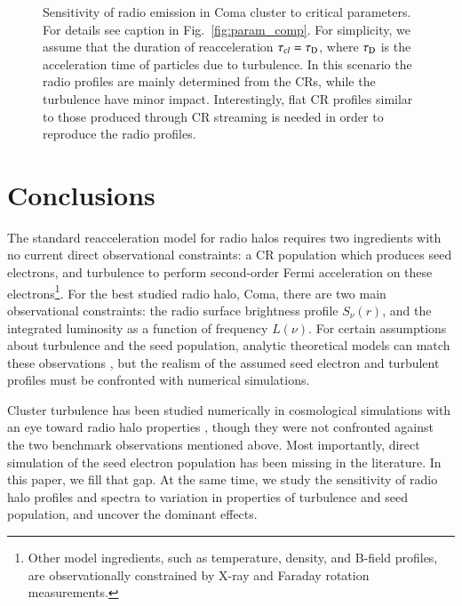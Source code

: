 \documentclass[fleqn,usenatbib,useAMS]{mnras}
\begin{document}
\begin{figure}
\begin{minipage}{1\columnwidth}
\begin{center}
   \end{center}
\end{minipage}
\caption{Sensitivity of radio emission in Coma cluster to critical
  parameters. For details see caption in
  Fig.~\ref{fig:param_comp}. For simplicity, we assume that the
  duration of reacceleration $\tau_{cl}=\tau_{\rm D}$, where $\tau_{\rm
    D}$ is the acceleration time of particles due to turbulence. In
  this scenario the radio profiles are mainly determined from the CRs,
  while the turbulence have minor impact. Interestingly, flat CR
  profiles similar to those produced through CR streaming is needed in
  order to reproduce the radio profiles.}
  \label{fig:param_comp_tcl_tD}
\end{figure}

\section{Conclusions}
\label{sec:conclusions}

The standard reacceleration model for radio halos requires two ingredients with
no current direct observational constraints: a CR population which produces seed
electrons, and turbulence to perform second-order Fermi acceleration on these
electrons\footnote{Other model ingredients, such as temperature, density, and
  B-field profiles, are observationally constrained by X-ray and Faraday
  rotation measurements.}. For the best studied radio halo, Coma, there are two
main observational constraints: the radio surface brightness profile
$S_{\nu}(r)$, and the integrated luminosity as a function of frequency
$L(\nu)$. For certain assumptions about turbulence and the seed population,
analytic theoretical models can match these observations \citep{brunetti11}, but
the realism of the assumed seed electron and turbulent profiles must be
confronted with numerical simulations.

Cluster turbulence has been studied numerically in cosmological simulations with
an eye toward radio halo properties \citep{2013ApJ...771..131B,
  miniati15}, though they were not confronted against the two
benchmark observations mentioned above. Most importantly, direct simulation of the
seed electron population has been missing in the literature. In this paper, we
fill that gap. At the same time, we study the sensitivity of radio halo profiles
and spectra to variation in properties of turbulence and seed population, and
uncover the dominant effects.
\end{document}
